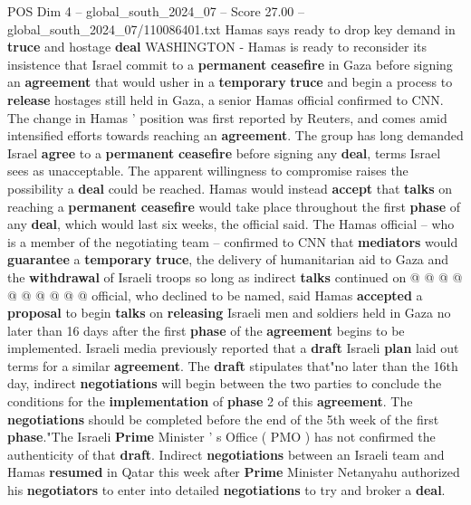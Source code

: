 \begin{textsample}{POS Dim 4 – global\_south\_2024\_07 – Score 27.00 – global\_south\_2024\_07/110086401.txt}  \label{ex:f4_pos_112}
Hamas says ready to drop key demand in \textbf{truce} and hostage \textbf{deal} WASHINGTON - Hamas is ready to reconsider its insistence that Israel commit to a \textbf{permanent} \textbf{ceasefire} in Gaza before signing an \textbf{agreement} that would usher in a \textbf{temporary} \textbf{truce} and begin a process to \textbf{release} hostages still held in Gaza, a senior Hamas official confirmed to CNN.
The change in Hamas ' position was first reported by Reuters, and comes amid intensified efforts towards reaching an \textbf{agreement}.
The group has long demanded Israel \textbf{agree} to a \textbf{permanent} \textbf{ceasefire} before signing any \textbf{deal}, terms Israel sees as unacceptable.
The apparent willingness to compromise raises the possibility a \textbf{deal} could be reached.
Hamas would instead \textbf{accept} that \textbf{talks} on reaching a \textbf{permanent} \textbf{ceasefire} would take place throughout the first \textbf{phase} of any \textbf{deal}, which would last six weeks, the official said.
The Hamas official -- who is a member of the negotiating team -- confirmed to CNN that \textbf{mediators} would \textbf{guarantee} a \textbf{temporary} \textbf{truce}, the delivery of humanitarian aid to Gaza and the \textbf{withdrawal} of Israeli troops so long as indirect \textbf{talks} continued on @ @ @ @ @ @ @ @ @ @ official, who declined to be named, said Hamas \textbf{accepted} a \textbf{proposal} to begin \textbf{talks} on \textbf{releasing} Israeli men and soldiers held in Gaza no later than 16 days after the first \textbf{phase} of the \textbf{agreement} begins to be implemented.
Israeli media previously reported that a \textbf{draft} Israeli \textbf{plan} laid out terms for a similar \textbf{agreement}.
The \textbf{draft} stipulates that"no later than the 16th day, indirect \textbf{negotiations} will begin between the two parties to conclude the conditions for the \textbf{implementation} of \textbf{phase} 2 of this \textbf{agreement}.
The \textbf{negotiations} should be completed before the end of the 5th week of the first \textbf{phase}."The Israeli \textbf{Prime} Minister ' s Office ( PMO ) has not confirmed the authenticity of that \textbf{draft}.
Indirect \textbf{negotiations} between an Israeli team and Hamas \textbf{resumed} in Qatar this week after \textbf{Prime} Minister Netanyahu authorized his \textbf{negotiators} to enter into detailed \textbf{negotiations} to try and broker a \textbf{deal}.

\end{textsample}
